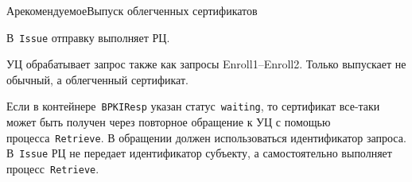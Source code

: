 \begin{appendix}{А}{рекомендуемое}{Выпуск облегченных сертификатов}
\label{PROCESSES.Enroll.Enveloped}

В~\texttt{Issue} отправку выполняет РЦ.

\label{PROCESSES.Enroll.Issue}

УЦ обрабатывает запрос также как запросы Enroll1--Enroll2.
Только выпускает не обычный, а облегченный сертификат.



Если в контейнере~\texttt{BPKIResp} указан статус~\texttt{waiting}, то сертификат 
все-таки может быть получен через повторное обращение к УЦ с помощью 
процесса~\texttt{Retrieve}. В обращении должен использоваться 
идентификатор запроса. 
%
В~\texttt{Issue} РЦ не передает идентификатор субъекту, 
а самостоятельно выполняет процесс~\texttt{Retrieve}.

\end{appendix}
  